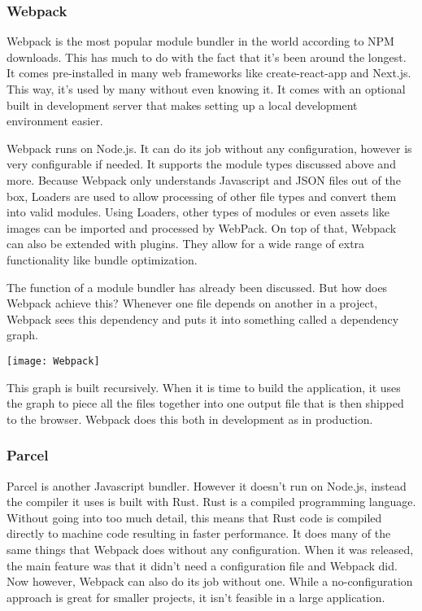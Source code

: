 \subsubsection{Webpack}

Webpack is the most popular module bundler in the world according to NPM downloads. This has much to do with the fact that it's been around the longest. It comes pre-installed in many web frameworks like create-react-app and Next.js. This way, it’s used by many without even knowing it. It comes with an optional built in development server that makes setting up a local development environment easier.

Webpack runs on Node.js. It can do its job without any configuration, however is very configurable if needed. It supports the module types discussed above and more. 
Because Webpack only understands Javascript and JSON files out of the box, Loaders are used to allow processing of other file types and convert them into valid modules.
Using Loaders, other types of modules or even assets like images can be imported and processed by WebPack. On top of that, Webpack can also be extended with plugins. They allow for a wide range of extra functionality like bundle optimization. 

The function of a module bundler has already been discussed. But how does Webpack achieve this? Whenever one file depends on another in a project, Webpack sees this dependency and puts it into something called a dependency graph. 

\texttt{[image: Webpack]}

This graph is built recursively. When it is time to build the application, it uses the graph to piece all the files together into one output file that is then shipped to the browser. Webpack does this both in development as in production. 

\subsubsection{Parcel}

Parcel is another Javascript bundler. However it doesn’t run on Node.js, instead the compiler it uses is built with Rust. Rust is a compiled programming language. Without going into too much detail, this means that Rust code is compiled directly to machine code resulting in faster performance. It does many of the same things that Webpack does without any configuration. When it was released, the main feature was that it didn’t need a configuration file and Webpack did. Now however, Webpack can also do its job without one. While a no-configuration approach is great for smaller projects, it isn’t feasible in a large application. 

